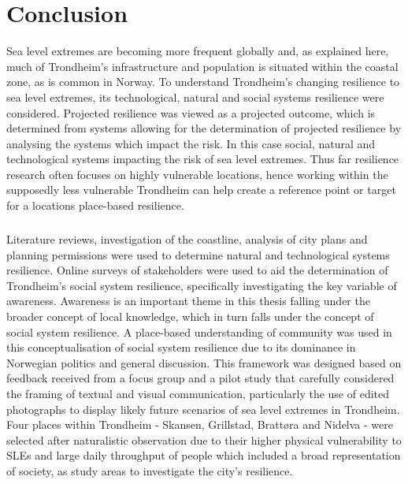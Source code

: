


\chapter{Conclusion}

Sea level extremes are becoming more frequent globally and, as explained here, much of Trondheim's infrastructure and population is situated within the coastal zone, as is common in Norway. To understand Trondheim's changing resilience to sea level extremes, its technological, natural and social systems resilience were considered.  Projected resilience was viewed as a projected outcome, which is determined from systems allowing for the determination of projected resilience by analysing the systems which impact the risk. In this case social, natural and technological systems impacting the risk of sea level extremes. Thus far resilience research often focuses on highly vulnerable locations, hence working within the supposedly less vulnerable Trondheim can help create a reference point or target for a locations place-based resilience.
\paragraph{}

Literature reviews, investigation of the coastline, analysis of city plans and planning permissions were used to determine natural and technological systems resilience. Online surveys of stakeholders were used to aid the determination of Trondheim's social system resilience, specifically investigating the key variable of awareness. Awareness is an important theme in this thesis falling under the broader concept of local knowledge, which in turn falls under the concept of social system resilience. A place-based understanding of community was used in this conceptualisation of social system resilience due to its dominance in Norwegian politics and general discussion. This framework was designed based on feedback received from a focus group and a pilot study that carefully considered the framing of textual and visual communication, particularly the use of edited photographs to display likely future scenarios of sea level extremes in Trondheim. Four places within Trondheim - Skansen, Grillstad, Brattøra and Nidelva - were selected after naturalistic observation due to their higher physical vulnerability to SLEs and large daily throughput of people which included a broad representation of society, as study areas to investigate the city's resilience.

